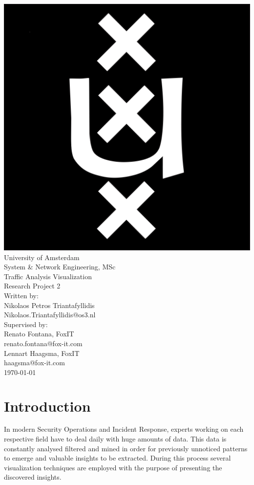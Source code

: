 \documentclass[16pt]{extreport}
\begin{document}
\begin{center}
\includegraphics[scale=0.07]{logo.png}\\
\huge{University of Amsterdam}\\
\huge{System \& Network Engineering, MSc}\\[1cm]
\Huge{Traffic Analysis Visualization}\\[0.2cm] 
\Large{Research Project 2}\\[2cm]
\large{Written by:}\\
\Large{Nikolaos Petros Triantafyllidis}\\
\large{Nikolaos.Triantafyllidis@os3.nl}\\[0.3cm]
\large{Supervised by:}\\
\Large{Renato Fontana, FoxIT}\\
\large{renato.fontana@fox-it.com}\\[0.1cm]
\Large{Lennart Haagsma, FoxIT}\\
\large{haagsma@fox-it.com}\\[4cm]
\today
\end{center}
\thispagestyle{empty}
\clearpage

\tableofcontents
 

\newpage
\chapter{Introduction}
\justify
\large{In modern Security Operations and Incident Response, experts working on each respective field have to deal daily with huge amounts of data. This data is constantly analysed filtered and mined in order for previously unnoticed patterns to emerge and valuable insights to be extracted. During this process several visualization techniques are employed with the purpose of presenting the discovered insights. }
\end{document}

